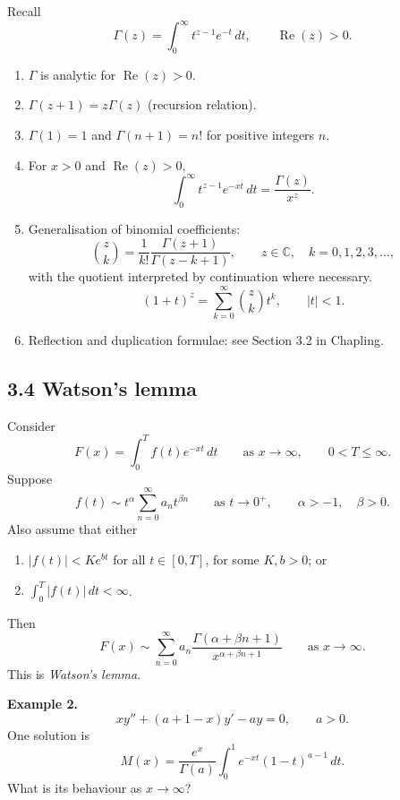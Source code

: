 \documentclass[11pt,a4paper]{article}
\begin{document}
Recall
\[
    \Gamma(z)=\int_0^\infty t^{z-1}e^{-t}\,dt,
    \qquad \operatorname{Re}(z)>0.
\]
\begin{enumerate}
    \renewcommand{\labelenumi}{(\alph{enumi})}
    \item $\Gamma$ is analytic for $\operatorname{Re}(z)>0$.
    \item $\Gamma(z+1)=z\Gamma(z)$ \quad (recursion relation).
    \item $\Gamma(1)=1$ and $\Gamma(n+1)=n!$ for positive integers $n$.
    \item For $x>0$ and $\operatorname{Re}(z)>0$,
    \[
        \int_0^\infty t^{z-1}e^{-xt}\,dt
        =\frac{\Gamma(z)}{x^z}.
    \]
    \item Generalisation of binomial coefficients:
    \[
        \binom{z}{k}
        =\frac{1}{k!}\frac{\Gamma(z+1)}{\Gamma(z-k+1)},
        \qquad z\in\mathbb{C},\quad k=0,1,2,3,\ldots,
    \]
    with the quotient interpreted by continuation where necessary.
    \[
        (1+t)^z=\sum_{k=0}^\infty\binom{z}{k}t^k,
        \qquad |t|<1.
    \]
    \item Reflection and duplication formulae: see Section 3.2 in
    Chapling.
\end{enumerate}

\subsection*{3.4 Watson's lemma}

Consider
\[
    F(x)=\int_0^T f(t)e^{-xt}\,dt
    \qquad\text{as }x\to\infty,
    \qquad 0<T\leq\infty.
\]
Suppose
\[
    f(t)\sim t^\alpha\sum_{n=0}^\infty a_n t^{\beta n}
    \qquad\text{as }t\to0^+,
    \qquad \alpha>-1,\quad\beta>0.
\]
Also assume that either
\begin{enumerate}
    \renewcommand{\labelenumi}{(\roman{enumi})}
    \item $|f(t)|<Ke^{bt}$ for all $t\in[0,T]$, for some $K,b>0$; or
    \item $\displaystyle\int_0^T |f(t)|\,dt<\infty$.
\end{enumerate}
Then
\[
    \boxed{
    F(x)\sim\sum_{n=0}^\infty
    a_n\frac{\Gamma(\alpha+\beta n+1)}{x^{\alpha+\beta n+1}}}
    \qquad\text{as }x\to\infty.
\]
This is \emph{Watson's lemma}.

\noindent\textbf{Example 2.}
\[
    xy''+(a+1-x)y'-ay=0,
    \qquad a>0.
\]
One solution is
\[
    M(x)=\frac{e^x}{\Gamma(a)}
    \int_0^1 e^{-xt}(1-t)^{a-1}\,dt.
\]
What is its behaviour as $x\to\infty$?
\end{document}
